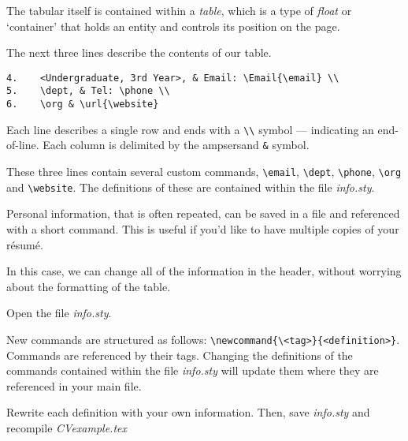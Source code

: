 The tabular itself is contained within a \emph{table}, which is a type of \emph{float} or `container' that holds an entity and controls its position on the page. \par

The next three lines describe the contents of our table. \par

\begin{lstlisting}
4.    <Undergraduate, 3rd Year>, & Email: \Email{\email} \\
5.    \dept, & Tel: \phone \\
6.    \org & \url{\website}
\end{lstlisting}

Each line describes a single row and ends with a \lstinline|\\| symbol --- indicating an end-of-line. Each column is delimited by the ampsersand \lstinline|&| symbol. \par

These three lines contain several custom commands, \lstinline|\email|, \lstinline|\dept|, \lstinline|\phone|, \lstinline|\org| and \lstinline|\website|. The definitions of these are contained within the file \emph{info.sty}. \par

Personal information, that is often repeated, can be saved in a file and referenced with a short command. This is useful if you'd like to have multiple copies of your r\'esum\'e. \par

In this case, we can change all of the information in the header, without worrying about the formatting of the table. \par

\begin{instrct}
Open the file \emph{info.sty}.
\end{instrct}

New commands are structured as follows: \lstinline|\newcommand{\<tag>}{<definition>}|. Commands are referenced by their tags. Changing the definitions of the commands contained within the file \emph{info.sty} will update them where they are referenced in your main file. \par

\begin{instrct}
Rewrite each definition with your own information. Then, save \emph{info.sty} and recompile \emph{CVexample.tex}
\end{instrct}


